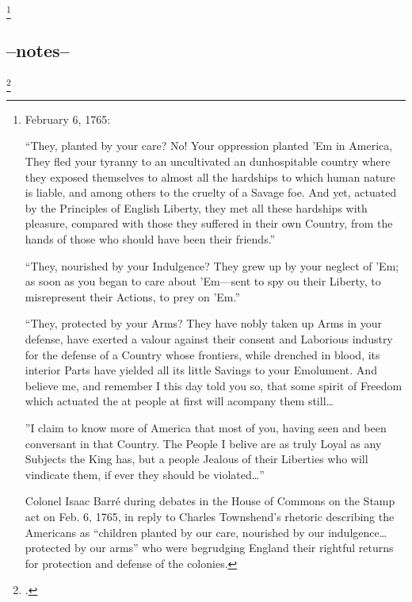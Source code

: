\begin{quotation}\end{quotation}




\footnote{
  February 6, 1765:

  ``They, planted by your care? No! Your oppression planted 'Em in America,
  They fled your tyranny to an uncultivated an dunhospitable country where they
  exposed themselves to almost all the hardships to which human nature is
  liable, and among others to the cruelty of a Savage foe. And yet, actuated by
  the Principles of English Liberty, they met all these hardships with pleasure,
  compared with those they suffered in their own Country, from the hands of
  those who should have been their friends.''

  ``They, nourished by your Indulgence? They grew up by your neglect of 'Em; as
  soon as you began to care about 'Em---sent to spy ou their Liberty, to
  misrepresent their Actions, to prey on 'Em.''

  ``They, protected by your Arms? They have nobly taken up Arms in your defense,
  have exerted a valour against their consent and Laborious industry for the
  defense of a Country whose frontiers, while drenched in blood, its interior
  Parts have yielded all its little Savings to your Emolument. And believe me,
  and remember I this day told you so, that some spirit of Freedom which
  actuated the at people at first will acompany them still\ldots
  
  ''I claim to know more of America that most of you, having seen and been
  conversant in that Country. The People I belive are as truly Loyal as any
  Subjects the King has, but a people Jealous of their Liberties who will
  vindicate them, if ever they should be violated\ldots''
  
  Colonel Isaac Barr\'e during debates in the House of Commons on the Stamp act
  on Feb. 6, 1765, in reply to Charles Townshend's rhetoric describing the
  Americans as ``children planted by our care, nourished by our indulgence\ldots
  protected by our arms'' who were begrudging England their rightful returns for
  protection and defense of the colonies.\cite[p. 67]{cook_long_1995}
} 

\subsection{--notes--}\footcite[p. 2]{moncure_cowpens_1996}

